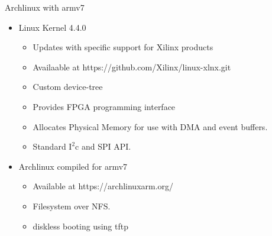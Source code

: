 
Archlinux with armv7

\begin{itemize}
\item Linux Kernel 4.4.0
  \begin{itemize}
  \item Updates with specific support for Xilinx products
  \item Availaable at https://github.com/Xilinx/linux-xlnx.git
  \item Custom device-tree
  \item Provides FPGA programming interface
  \item Allocates Physical Memory for use with DMA and event buffers.
  \item Standard $\mathrm{I^{2}c}$ and SPI API.
  \end{itemize}

\item Archlinux compiled for armv7
  \begin{itemize}
  \item Available at https://archlinuxarm.org/
  \item Filesystem over NFS.
  \item diskless booting using tftp
  \end{itemize}

\end{itemize}
